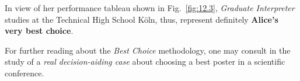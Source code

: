 In view of her performance tableau shown in Fig.~\vref{fig:12.3}, \emph{Graduate Interpreter} studies at the Technical High School Köln, thus, represent definitely \textbf{Alice's very best choice}.

\vspace{\baselineskip}
For further reading about the \Rubis \emph{Best Choice} methodology, one may consult in \citet{BIS-2015bestPoster} the study of a \emph{real decision-aiding case} about choosing a best poster in a scientific conference.
 

%
%
